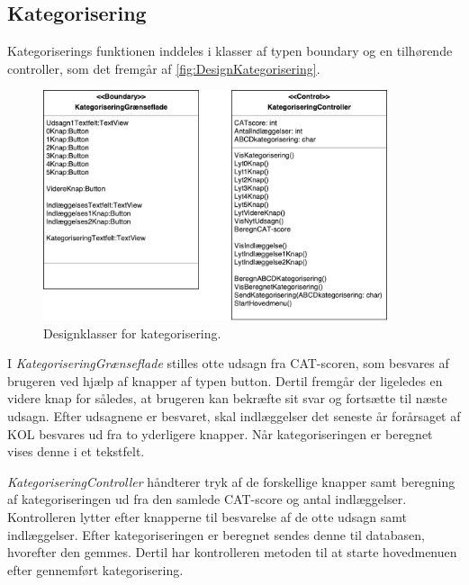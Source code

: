 \subsection{Kategorisering}
Kategoriserings funktionen inddeles i klasser af typen boundary og en tilhørende controller, som det fremgår af \autoref{fig:DesignKategorisering}.

\begin{figure} [H]
\centering
\includegraphics[width=0.9\textwidth]{figures/MVC/MVCKategorisering}
\caption{Designklasser for kategorisering.}
\label{fig:DesignKategorisering}
\end{figure}

I \textit{KategoriseringGrænseflade} stilles otte udsagn fra CAT-scoren, som besvares af brugeren ved hjælp af knapper af typen button. Dertil fremgår der ligeledes en videre knap for således, at brugeren kan bekræfte sit svar og fortsætte til næste udsagn. Efter udsagnene er besvaret, skal indlæggelser det seneste år forårsaget af KOL besvares ud fra to yderligere knapper. Når kategoriseringen er beregnet vises denne i et tekstfelt. 

\textit{KategoriseringController} håndterer tryk af de forskellige knapper samt beregning af kategoriseringen ud fra den samlede CAT-score og antal indlæggelser. Kontrolleren lytter efter knapperne til besvarelse af de otte udsagn samt indlæggelser. Efter kategoriseringen er beregnet sendes denne til databasen, hvorefter den gemmes. Dertil har kontrolleren metoden til at starte hovedmenuen efter gennemført kategorisering.  